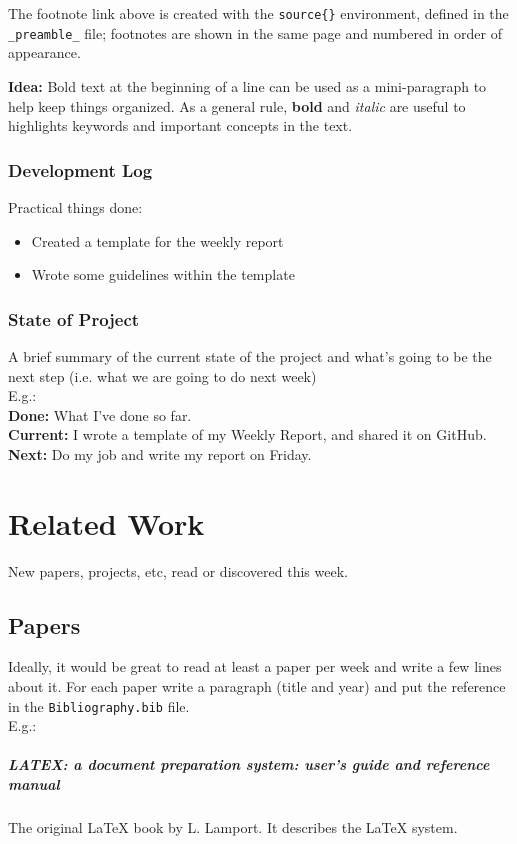 The footnote link above is created with the \verb|source{}| environment, defined in the \verb|_preamble_| file;
footnotes are shown in the same page and numbered in order of appearance.

\textbf{Idea:} Bold text at the beginning of a line can be used as a mini-paragraph to help keep things organized.
As a general rule, \textbf{bold} and \textit{italic} are useful to highlights keywords and important concepts in the text.
%
\subsection{Development Log}
Practical things done:
\begin{itemize}
  \item Created a template for the weekly report
  \item Wrote some guidelines within the template
\end{itemize}
%
\subsection{State of Project}
A brief summary of the current state of the project and what's going to be the next step (i.e. what we are going to do next week)\\
E.g.:\\
\textbf{Done:} What I've done so far.\\
\textbf{Current:} I wrote a template of my Weekly Report, and shared it on GitHub.\\
\textbf{Next:} Do my job and write my report on Friday.

\chapter{Related Work}
New papers, projects, etc, read or discovered this week.
\section{Papers}
Ideally, it would be great to read at least a paper per week and write a few lines about it. For each paper write a paragraph (title and year) and put the reference in the \verb|Bibliography.bib| file.\\
E.g.:
\paragraph{LATEX: a document preparation system: user's guide and reference manual}\cite{lamport1994latex} The original LaTeX book  by L. Lamport. It describes the LaTeX system.
